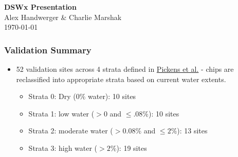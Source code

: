 \documentclass[8pt]{beamer}
\begin{document}
\begin{frame}
\begin{center}
\textbf{DSWx Presentation}\\
\vspace{.5cm}
Alex Handwerger \& Charlie Marshak \\

\today\\
\end{center}
\end{frame}


\begin{frame}
\frametitle{Validation Summary}
\tiny
\begin{itemize}
\item 52 validation sites across 4 strata defined in \href{https://www.sciencedirect.com/science/article/pii/S0034425720301620}{Pickens et al.} - chips are reclassified into appropriate strata based on current water extents.
\begin{itemize}
\tiny
\item Strata 0: Dry (0$\%$ water): 10 sites
\item Strata 1: low water ($>0$ and $\leq.08\%$): 10 sites
\item Strata 2: moderate  water ($>0.08\%$ and $\leq 2\%$): 13 sites
\item Strata 3: high water ($>2\%$): 19 sites
\end{itemize}
\end{itemize}

\begin{center}



\vspace{.25cm}



\end{center}
\end{frame}



\end{document}
